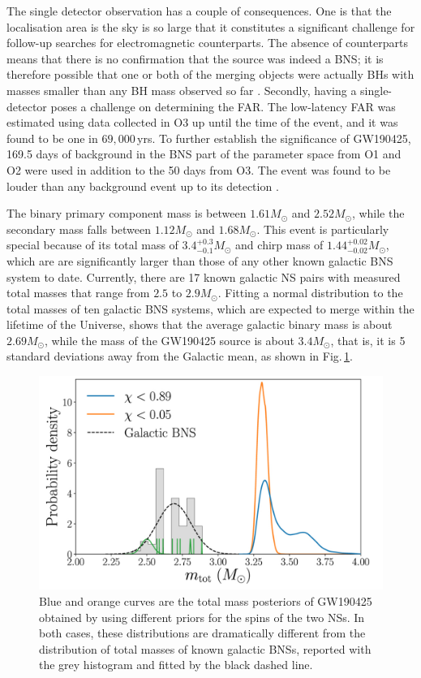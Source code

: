 \documentclass[binding=0.6cm, LaM]{sapthesis}
\begin{document}
	The single detector observation has a couple of consequences. 
	One is that the localisation area is the sky is so large
	that it constitutes a significant challenge for follow-up searches for electromagnetic counterparts. 
	The absence of counterparts means that there is no confirmation that the source was indeed a BNS; 
	it is therefore possible that one or both of the merging objects were actually 
	BHs with masses smaller than any BH mass observed so far \cite{175}.
	Secondly, having a single-detector poses a challenge on determining the FAR.
	The low-latency FAR was estimated using data collected in O3 
	up until the time of the event, and it was found to be one in $69,000\,$yrs. 
	To further establish the significance of GW190425, 169.5 
	days of background in the BNS part of the parameter space from O1 and O2 were used in addition to the 50 days
	from O3.  The event was found to be 
	louder than any background event up to its detection \cite{175}.

	The binary primary component mass is between $1.61M_\odot$ and $2.52 M_\odot$, 
	while the secondary mass falls between $1.12M_\odot$ and $1.68 M_\odot$.
	This event is particularly special because of its total mass of $3.4^{+0.3}_{-0.1} M_\odot$ 
	and chirp mass of $1.44^{+0.02}_{-0.02}M_\odot$, which are are significantly larger 
	than those of any other known galactic BNS system to date. 
	Currently, there are 17 known galactic NS pairs with measured total masses 
	that range from $2.5$ to $2.9M_\odot$.
	Fitting a normal distribution to the total masses of ten galactic BNS systems, 
	which are expected to merge within the lifetime of the Universe, 
	shows that the average galactic binary mass is about $2.69M_\odot$, 
	while the mass of the GW190425 source is about $3.4M_\odot$, that is,
	it is 5 standard deviations away from the Galactic mean, as shown in Fig.\,\ref{fig:secondbns}.

        \begin{figure}[!t]
          \label{secondbns}
          \includegraphics[scale=0.3]{secondbns}
          \centering
          \caption{Blue and orange curves are the total mass posteriors of GW190425 obtained by using different priors for the spins of the two NSs. In both cases, these distributions are dramatically different from the distribution of total masses of known galactic BNSs, reported with the grey histogram and fitted by the black dashed line. \cite{62}}
          \label{fig:secondbns}
        \end{figure}
\end{document}
